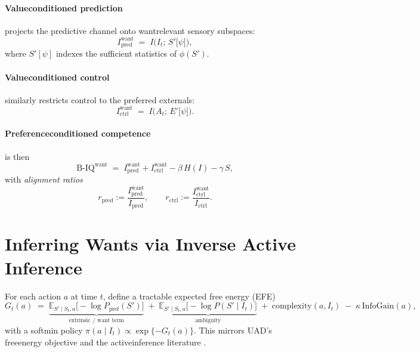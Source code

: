 \documentclass[11pt]{article}
\begin{document}
\paragraph{Value\textendash conditioned prediction} projects the predictive channel onto want\textendash relevant sensory subspaces:
\begin{equation}
I^{\text{want}}_{\mathrm{pred}} \;=\; I\big(I_t;\, S'\big[\psi\big]\big),
\end{equation}
where $S'[\psi]$ indexes the sufficient statistics of $\phi(S')$.

\paragraph{Value\textendash conditioned control} similarly restricts control to the preferred externals:
\begin{equation}
I^{\text{want}}_{\mathrm{ctrl}} \;=\; I\big(A_t;\, E'\big[\psi\big]\big).
\end{equation}

\paragraph{Preference\textendash conditioned competence} is then
\begin{equation}
\mathrm{B\text{-}IQ}^{\text{want}} \;=\; I^{\text{want}}_{\mathrm{pred}} + I^{\text{want}}_{\mathrm{ctrl}} - \beta\,H(I) - \gamma\,S,
\end{equation}
with \emph{alignment ratios}
\begin{equation}
 r_{\mathrm{pred}} := \frac{I^{\text{want}}_{\mathrm{pred}}}{I_{\mathrm{pred}}}, \qquad r_{\mathrm{ctrl}} := \frac{I^{\text{want}}_{\mathrm{ctrl}}}{I_{\mathrm{ctrl}}}.
\end{equation}

\section{Inferring Wants via Inverse Active Inference}
\label{sec:inverse}
For each action $a$ at time $t$, define a tractable expected free energy (EFE)
\begin{equation}
G_t(a) \;=\; \underbrace{\mathbb E_{S'\mid S_t,a}\big[-\log P_{\mathrm{pref}}(S')\big]}_{\text{extrinsic / want term}}\; +\; \underbrace{\mathbb E_{S'\mid S_t,a}\big[-\log P(S'\mid I_t)\big]}_{\text{ambiguity}}\; +\; \mathrm{complexity}(a,I_t)\; -\; \kappa\,\mathrm{InfoGain}(a),
\end{equation}
with a softmin policy $\pi(a\mid I_t) \propto \exp\{-G_t(a)\}$. This mirrors UAD's free\textendash energy objective \citep{ZarnckeUAD} and the active\textendash inference literature \citep{Friston2010}.
\end{document}
